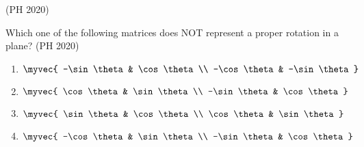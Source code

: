 \hfill (PH 2020)
    \item Which one of the following matrices does NOT represent a proper rotation in a plane?
\hfill	    (PH 2020)
\begin{multicols}{2}
    \begin{enumerate}
        \item $
        \myvec{
        -\sin\theta & \cos\theta \\
        -\cos\theta & -\sin\theta
        }
        $
        \item $
        \myvec{
        \cos\theta & \sin\theta \\
        -\sin\theta & \cos\theta
        }
        $
        \item $
        \myvec{
        \sin\theta & \cos\theta \\
        \cos\theta & \sin\theta
        }
        $
        \item $
        \myvec{
        -\cos\theta & \sin\theta \\
        -\sin\theta & \cos\theta
        }$
    \end{enumerate}
\end{multicols}
